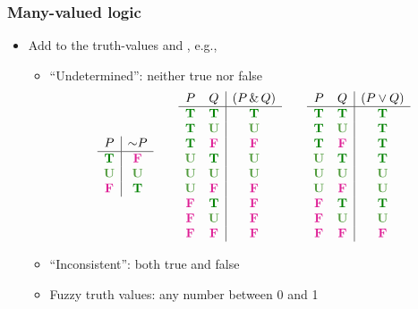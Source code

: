 \begin{frame}
    \frametitle{Many-valued logic}
\def\I{\textcolor{highlightA}{\textbf{U}}}
\begin{itemize}
\item Add to the truth-values \True{} and \False, e.g.,
\begin{itemize}
\item ``Undetermined'': neither true nor false
\[
\begin{array}{c|c}
P & \lnot P\\
\hline
\True & \False \\
\I & \I\\
\False & \True
\end{array}
\qquad
\begin{array}{cc|c}
P & Q & (P \land Q)\\
\hline
\True & \True & \True\\
\True & \I & \I\\
\True & \False & \False\\
\I & \True & \I\\
\I & \I & \I\\
\I & \False & \False\\
\False & \True & \False\\
\False & \I & \False\\
\False & \False & \False
\end{array}
\qquad
\begin{array}{cc|c}
P & Q & (P \lor Q)\\
\hline
\True & \True & \True\\
\True & \I & \True\\
\True & \False & \True\\
\I & \True & \True\\
\I & \I & \I\\
\I & \False & \I\\
\False & \True & \True\\
\False & \I & \I\\
\False & \False & \False
\end{array}
\]
\item ``Inconsistent'': both true and false
\item Fuzzy truth values: any number between 0 and 1
\end{itemize}
\end{itemize}

\end{frame}


